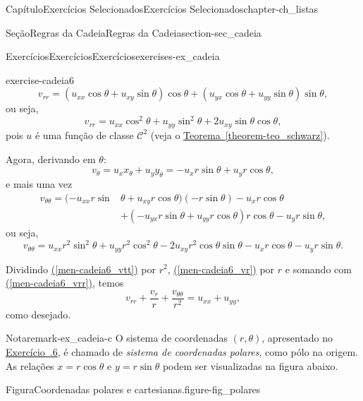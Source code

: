 \documentclass[oneside,10pt,]{book}
\newcommand{\xreffont}{\relax}
\numberwithin{equation}{section}
\begin{document}
\begin{chapterptx}{Capítulo}{Exercícios Selecionados}{}{Exercícios Selecionados}{}{}{chapter-ch_listas}
\begin{sectionptx}{Seção}{Regras da Cadeia}{}{Regras da Cadeia}{}{}{section-sec_cadeia}
\begin{exercises-subsection-numberless}{Exercícios}{Exercícios}{}{Exercícios}{}{}{exercises-ex_cadeia}
\begin{divisionexercise}{6}{}{}{exercise-cadeia6}
\begin{equation*}
v_{rr}=(u_{xx}\cos\theta+u_{xy}\sin\theta)\cos\theta 
+(u_{yx}\cos\theta+u_{yy}\sin\theta)\sin\theta,
\end{equation*}
ou seja,%
\begin{equation}
v_{rr}=u_{xx}\cos^2\theta+
u_{yy}\sin^2\theta+2u_{xy}\sin\theta\cos\theta,\label{men-cadeia6_vrr}
\end{equation}
pois \(u\) é uma função de classe \(\mathscr{C}^2\) (veja o \hyperref[theorem-teo_schwarz]{Teorema~{\xreffont\ref{theorem-teo_schwarz}}}).%
\par
Agora, derivando em \(\theta\):%
\begin{equation*}
v_\theta =
u_xx_\theta+u_yy_\theta=-u_xr\sin\theta+u_yr\cos\theta,
\end{equation*}
e mais uma vez%
\begin{align*}
v_{\theta\theta}=(-u_{xx}r\sin&\theta+u_{xy}r\cos\theta)(-r\sin\theta)-u_xr\cos\theta\\
&+(-u_{yx}r\sin\theta+u_{yy}r\cos\theta)r\cos\theta-u_yr\sin\theta,
\end{align*}
ou seja,%
\begin{equation}
v_{\theta\theta}=u_{xx}r^2\sin^2\theta+
u_{yy}r^2\cos^2\theta-2u_{xy}r^2\cos\theta\sin\theta-
u_xr\cos\theta-u_yr\sin\theta.\label{men-cadeia6_vtt}
\end{equation}
%
\par
Dividindo \hyperref[men-cadeia6_vtt]{({\xreffont\ref{men-cadeia6_vtt}})} por \(r^2\), \hyperref[men-cadeia6_vr]{({\xreffont\ref{men-cadeia6_vr}})} por \(r\) e somando com \hyperref[men-cadeia6_vrr]{({\xreffont\ref{men-cadeia6_vrr}})}, temos%
\begin{equation*}
v_{rr}+\dfrac{v_r}{r}+\dfrac{v_{\theta\theta}}{r^2}=u_{xx}+u_{yy},
\end{equation*}
como desejado.%
\end{divisionexercise}%
\begin{remark}{Nota}{}{remark-ex_cadeia-c}%
O sistema de coordenadas \((r,\theta)\), apresentado no \hyperlink{exercise-cadeia6}{Exercício~{\xreffont 1.6.6}}, é chamado de \emph{sistema de coordenadas polares}, como pólo na origem. As relações \(x=r\cos\theta\) e \(y=r\sin\theta\) podem ser visualizadas na figura abaixo. \begin{figureptx}{Figura}{Coordenadas polares e cartesianas.}{figure-fig_polares}{}%
\begin{image}{0.05}{0.9}{0.05}{}%
\end{image}
\end{figureptx}
\end{remark}
\end{exercises-subsection-numberless}
\end{sectionptx}
\end{chapterptx}
\end{document}
